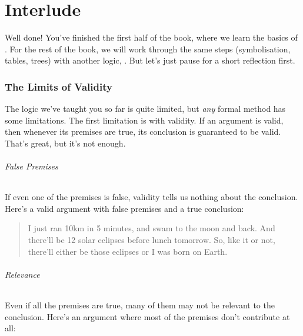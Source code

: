 \documentclass[PHIL101-Textbook.tex]{subfiles}
\begin{document}
\part*{Interlude}\label{part:interlude}



Well done! You've finished the first half of the book, where we learn the basics of \tfl. For the rest of the book, we will work through the same steps (symbolisation, tables, trees) with another logic, \pl. But let's just pause for a short reflection first.


\section*{The Limits of Validity}

The logic we've taught you so far is quite limited, but \emph{any} formal method has some limitations. The first limitation is with validity. If an argument is valid, then whenever its premises are true, its conclusion is guaranteed to be valid. That's great, but it's not enough.\\

\paragraph{False Premises} If even one of the premises is false, validity tells us nothing about the conclusion. Here's a valid argument with false premises and a true conclusion:

\begin{quotation}I just ran 10km in 5 minutes, and swam to the moon and back. And there'll be 12 solar eclipses before lunch tomorrow. So, like it or not, there'll either be those eclipses or I was born on Earth.\end{quotation}

\paragraph{Relevance} Even if all the premises are true, many of them may not be relevant to the conclusion. Here's an argument where most of the premises don't contribute at all:
\end{document}
